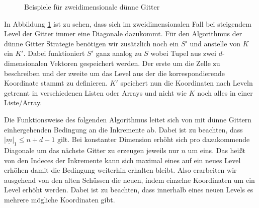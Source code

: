 \documentclass[a4paper,12pt]{llncs}
\numberwithin{equation}{section}
\begin{document}
\begin{figure}
	\caption{Beispiele für zweidimensionale dünne Gitter}
	\label{fig:gitter03}
\end{figure}

In Abbildung \ref{fig:gitter03} ist zu sehen, dass sich im zweidimensionalen Fall bei steigendem Level der Gitter immer eine Diagonale dazukommt. Für den Algorithmus der dünne Gitter Strategie benötigen wir zusätzlich noch ein $S'$ und anstelle von $K$ ein $K'$. Dabei funktioniert $S'$ ganz analog zu $S$ wobei Tupel aus zwei $d$-dimensionalen Vektoren gespeichert werden. Der erste um die Zelle zu beschreiben und der zweite um das Level aus der die korrespondierende Koordinate stammt zu definieren. $K'$ speichert nun die Koordinaten nach Leveln getrennt in verschiedenen Listen oder Arrays und nicht wie $K$ noch alles in einer Liste/Array.

Die Funktionsweise des folgenden Algorithmus leitet sich von mit dünne Gittern einhergehenden Bedingung an die Inkremente ab. Dabei ist zu beachten, dass $|\underline{m}|_1\leq n+d-1$ gilt. Bei konstanter Dimension erhöht sich pro dazukommende Diagonale um das nächste Gitter zu erzeugen jeweils nur $n$ um eins. Das heißt von den Indeces der Inkremente kann sich maximal eines auf ein neues Level erhöhen damit die Bedingung weiterhin erhalten bleibt. Also erarbeiten wir ausgehend von den alten Schüssen  die neuen, indem einzelne Koordinaten um ein Level erhöht werden. Dabei ist zu beachten, dass innerhalb eines neuen Levels es mehrere mögliche Koordinaten gibt. 
\end{document}
